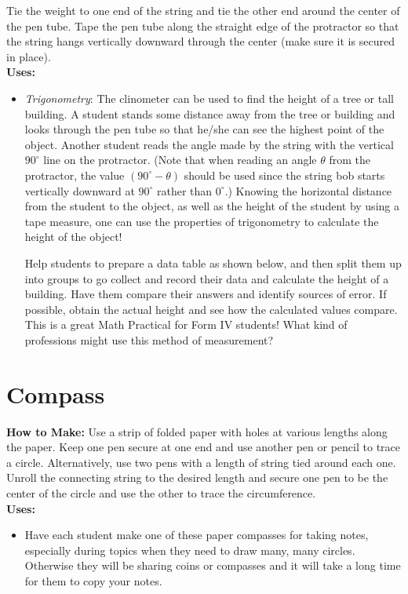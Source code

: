Tie the weight to one end of the string and tie the other end around the center of the pen tube. Tape the pen tube along the straight edge of the protractor so that the string hangs vertically downward through the center (make sure it is secured in place).\\

\noindent\textbf{Uses:}
\begin{itemize}
\item \emph{Trigonometry}: The clinometer can be used to find the height of a tree or tall building. A student stands some distance away from the tree or building and looks through the pen tube so that he\slash she can see the highest point of the object. Another student reads the angle made by the string with the vertical $90^\circ$ line on the protractor. (Note that when reading an angle $\theta$ from the protractor, the value $(90^\circ - \theta)$ should be used since the string bob starts vertically downward at $90^\circ$ rather than $0^\circ$.) Knowing the horizontal distance from the student to the object, as well as the height of the student by using a tape measure, one can use the properties of trigonometry to calculate the height of the object!

Help students to prepare a data table as shown below, and then split them up into groups to go collect and record their data and calculate the height of a building. Have them compare their answers and identify sources of error. If possible, obtain the actual height and see how the calculated values compare. This is a great Math Practical for Form IV students! What kind of professions might use this method of measurement?
\end{itemize}

\section{Compass} \label{compass}
\textbf{How to Make:} Use a strip of folded paper with holes at various lengths along the paper. Keep one pen secure at one end and use another pen or pencil to trace a circle. Alternatively, use two pens with a length of string tied around each one. Unroll the connecting string to the desired length and secure one pen to be the center of the circle and use the other to trace the circumference.\\

\noindent\textbf{Uses:}
\begin{itemize}
\item Have each student make one of these paper compasses for taking notes, especially during topics when they need to draw many, many circles. Otherwise they will be sharing coins or compasses and it will take a long time for them to copy your notes.
\end{itemize}

